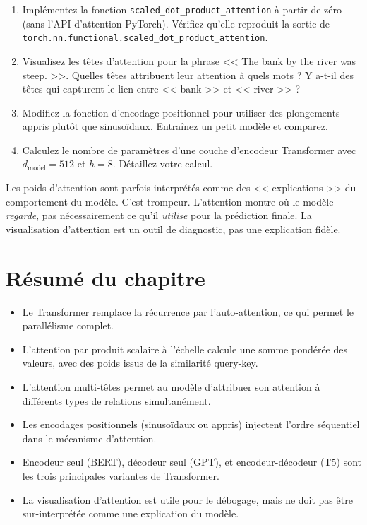 \begin{exercise}
\begin{enumerate}
  \item Impl\'ementez la fonction \texttt{scaled\_dot\_product\_attention} \`a partir de z\'ero (sans l'API d'attention PyTorch). V\'erifiez qu'elle reproduit la sortie de \texttt{torch.nn.functional.scaled\_dot\_product\_attention}.
  \item Visualisez les t\^etes d'attention pour la phrase << The bank by the river was steep. >>. Quelles t\^etes attribuent leur attention \`a quels mots ? Y a-t-il des t\^etes qui capturent le lien entre << bank >> et << river >> ?
  \item Modifiez la fonction d'encodage positionnel pour utiliser des plongements appris plut\^ot que sinuso\"idaux. Entra\^inez un petit mod\`ele et comparez.
  \item Calculez le nombre de param\`etres d'une couche d'encodeur Transformer avec $d_{\text{model}}=512$ et $h=8$. D\'etaillez votre calcul.
\end{enumerate}
\end{exercise}

\begin{ethicsbox}
Les poids d'attention sont parfois interpr\'et\'es comme des << explications >> du comportement du mod\`ele. C'est trompeur. L'attention montre o\`u le mod\`ele \emph{regarde}, pas n\'ecessairement ce qu'il \emph{utilise} pour la pr\'ediction finale. La visualisation d'attention est un outil de diagnostic, pas une explication fid\`ele.
\end{ethicsbox}

\section{R\'esum\'e du chapitre}

\begin{itemize}
  \item Le Transformer remplace la r\'ecurrence par l'auto-attention, ce qui permet le parall\'elisme complet.
  \item L'attention par produit scalaire \`a l'\'echelle calcule une somme pond\'er\'ee des valeurs, avec des poids issus de la similarit\'e query-key.
  \item L'attention multi-t\^etes permet au mod\`ele d'attribuer son attention \`a diff\'erents types de relations simultan\'ement.
  \item Les encodages positionnels (sinuso\"idaux ou appris) injectent l'ordre s\'equentiel dans le m\'ecanisme d'attention.
  \item Encodeur seul (BERT), d\'ecodeur seul (GPT), et encodeur-d\'ecodeur (T5) sont les trois principales variantes de Transformer.
  \item La visualisation d'attention est utile pour le d\'ebogage, mais ne doit pas \^etre sur-interpr\'et\'ee comme une explication du mod\`ele.
\end{itemize}
